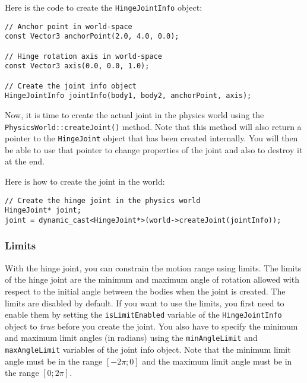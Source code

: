 \documentclass[a4paper,12pt]{article}
\begin{document}
    Here is the code to create the \texttt{HingeJointInfo} object: \\

    \begin{lstlisting}
// Anchor point in world-space
const Vector3 anchorPoint(2.0, 4.0, 0.0);

// Hinge rotation axis in world-space
const Vector3 axis(0.0, 0.0, 1.0);

// Create the joint info object
HingeJointInfo jointInfo(body1, body2, anchorPoint, axis);
  \end{lstlisting}

    \vspace{0.6cm}

    \begin{sloppypar}
    Now, it is time to create the actual joint in the physics world using the \texttt{PhysicsWorld::createJoint()} method.
    Note that this method will also return a pointer to the \texttt{HingeJoint} object that has been created internally. You will then
    be able to use that pointer to change properties of the joint and also to destroy it at the end. \\
    \end{sloppypar}

    Here is how to create the joint in the world: \\

    \begin{lstlisting}
// Create the hinge joint in the physics world
HingeJoint* joint;
joint = dynamic_cast<HingeJoint*>(world->createJoint(jointInfo));
  \end{lstlisting}

     \subsubsection{Limits}

     With the hinge joint, you can constrain the motion range using limits. The limits of the hinge joint are the minimum and maximum angle of rotation allowed with respect to the initial
     angle between the bodies when the joint is created. The limits are disabled by default. If you want to use the limits, you first need to enable them by setting the
     \texttt{isLimitEnabled} variable of the \texttt{HingeJointInfo} object to \emph{true} before you create the joint. You also have to specify the minimum and maximum limit
     angles (in radians) using the \texttt{minAngleLimit} and \texttt{maxAngleLimit} variables of the joint info object. Note that the minimum limit angle must be in the
     range $[ -2 \pi; 0 ]$ and the maximum limit angle must be in the range $[ 0; 2 \pi ]$. \\
\end{document}
